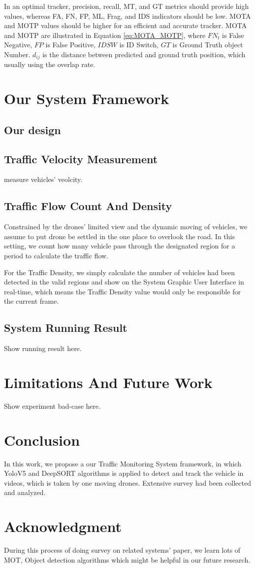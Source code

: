 \documentclass[10pt,twocolumn,letterpaper]{article}  %
\begin{document}
In an optimal tracker, precision, recall, MT, and GT metrics should provide high values, whereas FA, FN, FP, ML, Frag, and IDS indicators should be low. MOTA and MOTP values should be higher for an efficient and accurate tracker. MOTA and MOTP are illustrated in Equation \ref{eq:MOTA_MOTP}, where $FN_t$ is False Negative, $FP$ is False Positive, $IDSW$ is ID Switch, $GT$ is Ground Truth object Number. $d_{ij}$ is the distance between predicted and ground truth position, which usually using the overlap rate.


\section{Our System Framework}
\subsection{Our design}

\subsection{Traffic Velocity Measurement}
measure vehicles' veolcity.

\subsection{Traffic Flow Count And Density}
Constrained by the drones' limited view and the dynamic moving of vehicles, we assume to put drone be settled in the one place to overlook the road. In this setting, we count how many vehicle pass through the designated region for a period to calculate the traffic flow. 


For the Traffic Density, we simply calculate the number of vehicles had been detected in the valid regions and show on the System Graphic User Interface in real-time, which means the Traffic Density value would only be responsible for the current frame.
 
 
 \subsection{System Running Result}
 Show running result here.

\section{Limitations And Future Work}
Show experiment bad-case here.


\section{Conclusion}
In this work, we propose a our Traffic Monitoring System framework, in which YoloV5 and DeepSORT algorithms is applied to detect and track the vehicle in videos, which is taken by one moving drones. Extensive survey had been collected and analyzed.

\section*{Acknowledgment}
During this process of doing survey on related systems' paper, we learn lots of MOT, Object detection algorithms which might be helpful in our future research.


{\small
	
	
}
\end{document}
